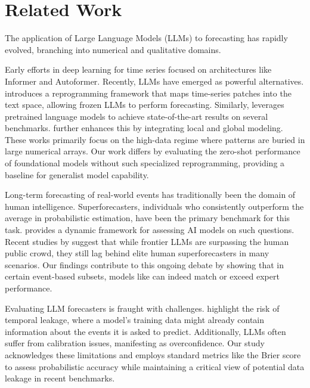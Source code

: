 \section{Related Work}

The application of Large Language Models (LLMs) to forecasting has rapidly evolved, branching into numerical and qualitative domains.

 Early efforts in deep learning for time series focused on architectures like Informer and Autoformer. Recently, LLMs have emerged as powerful alternatives. \timellm \cite{jin2024timellm} introduces a reprogramming framework that maps time-series patches into the text space, allowing frozen LLMs to perform forecasting. Similarly, \onefitsall \cite{zhou2023onefitsall} leverages pretrained language models to achieve state-of-the-art results on several benchmarks. \logollm \cite{ou2025logollm} further enhances this by integrating local and global modeling. These works primarily focus on the high-data regime where patterns are buried in large numerical arrays. Our work differs by evaluating the zero-shot performance of foundational models without such specialized reprogramming, providing a baseline for generalist model capability.

 Long-term forecasting of real-world events has traditionally been the domain of human intelligence. Superforecasters, individuals who consistently outperform the average in probabilistic estimation, have been the primary benchmark for this task. \forecastbench \cite{karger2025forecastbench} provides a dynamic framework for assessing AI models on such questions. Recent studies by \citet{lu2025evaluating} suggest that while frontier LLMs are surpassing the human public crowd, they still lag behind elite human superforecasters in many scenarios. Our findings contribute to this ongoing debate by showing that in certain event-based subsets, models like \methodname can indeed match or exceed expert performance.

 Evaluating LLM forecasters is fraught with challenges. \citet{paleka2025pitfalls} highlight the risk of temporal leakage, where a model's training data might already contain information about the events it is asked to predict. Additionally, LLMs often suffer from calibration issues, manifesting as overconfidence. Our study acknowledges these limitations and employs standard metrics like the Brier score to assess probabilistic accuracy while maintaining a critical view of potential data leakage in recent benchmarks.
